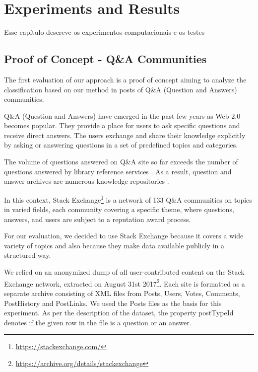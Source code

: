 \chapter{\hspace*{3pt} Experiments and Results}
\label{chapter:experiments}

Esse capítulo descreve os experimentos computacionais e os testes 

\section{\hspace*{3pt} Proof of Concept - Q\&A Communities}
\label{section:proof-of-concept}

The first evaluation of our approach is a proof of concept aiming to analyze the classification based on our method in posts of  Q\&A (Question and Answers) communities. 

Q\&A (Question and Answers) have emerged in the past few years as Web 2.0 becomes popular. They provide a place for users to ask specific questions and receive direct answers. 
The users exchange and share their knowledge explicitly by asking or answering questions in a set of predefined topics and categories. 

The volume of questions answered on Q\&A site so far exceeds the number of questions answered by library reference services \cite{Shah:2010} . As a result,  question and answer archives are numerous knowledge repositories \cite{Andrzejewski:2009}.


In this context, Stack Exchange\footnote{\url{https://stackexchange.com/}}
is a network of 133 Q\&A communities on topics in varied fields, each community covering a specific theme, where questions, answers, and users are subject to a reputation award process.

For our evaluation, we decided to use Stack Exchange because it covers a wide variety of topics and also because they make data available publicly in a structured way. 

We relied on an anonymized dump of all user-contributed content on the Stack Exchange network, extracted on August 31st 2017\footnote{\url{https://archive.org/details/stackexchange}}. Each site is formatted as a separate archive consisting of XML files from Posts, Users, Votes, Comments, PostHistory and PostLinks. We used the Posts files as the basis for this experiment. As per the description of the dataset, the property postTypeId denotes if the given row in the file is a question or an answer. 

